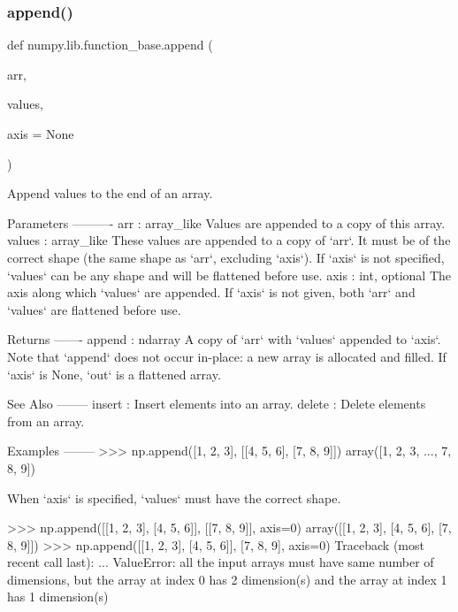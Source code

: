 \subsubsection{\texorpdfstring{append()}{append()}}
{\footnotesize\ttfamily def numpy.\+lib.\+function\+\_\+base.\+append (\begin{DoxyParamCaption}\item[{}]{arr,  }\item[{}]{values,  }\item[{}]{axis = {\ttfamily None} }\end{DoxyParamCaption})}

\begin{DoxyVerb}Append values to the end of an array.

Parameters
----------
arr : array_like
    Values are appended to a copy of this array.
values : array_like
    These values are appended to a copy of `arr`.  It must be of the
    correct shape (the same shape as `arr`, excluding `axis`).  If
    `axis` is not specified, `values` can be any shape and will be
    flattened before use.
axis : int, optional
    The axis along which `values` are appended.  If `axis` is not
    given, both `arr` and `values` are flattened before use.

Returns
-------
append : ndarray
    A copy of `arr` with `values` appended to `axis`.  Note that
    `append` does not occur in-place: a new array is allocated and
    filled.  If `axis` is None, `out` is a flattened array.

See Also
--------
insert : Insert elements into an array.
delete : Delete elements from an array.

Examples
--------
>>> np.append([1, 2, 3], [[4, 5, 6], [7, 8, 9]])
array([1, 2, 3, ..., 7, 8, 9])

When `axis` is specified, `values` must have the correct shape.

>>> np.append([[1, 2, 3], [4, 5, 6]], [[7, 8, 9]], axis=0)
array([[1, 2, 3],
       [4, 5, 6],
       [7, 8, 9]])
>>> np.append([[1, 2, 3], [4, 5, 6]], [7, 8, 9], axis=0)
Traceback (most recent call last):
    ...
ValueError: all the input arrays must have same number of dimensions, but
the array at index 0 has 2 dimension(s) and the array at index 1 has 1
dimension(s)\end{DoxyVerb}
 \mbox{\label{namespacenumpy_1_1lib_1_1function__base_a9436e843598930a32c1b0e4fd7cbda86}} 

